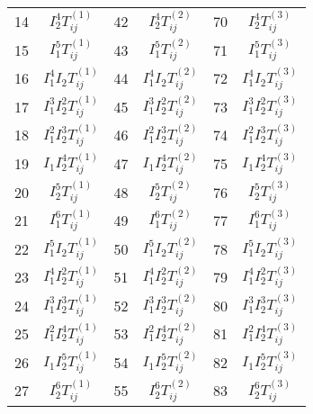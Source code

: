 \documentclass[10pt,a4paper,twoside]{article}
\begin{document}
\begin{center}
\begin{tabular}{r|c||r|c||r|c}
14 & $I_2^4 T_{ij}^{(1)}$ & 42 & $I_2^4 T_{ij}^{(2)}$ & 70 & $I_2^4 T_{ij}^{(3)}$\\
15 & $I_1^5 T_{ij}^{(1)}$ & 43 & $I_1^5 T_{ij}^{(2)}$ & 71 & $I_1^5 T_{ij}^{(3)}$\\
16 & $I_1^4I_2 T_{ij}^{(1)}$ & 44 & $I_1^4I_2 T_{ij}^{(2)}$ & 72 & $I_1^4I_2 T_{ij}^{(3)}$\\
17 & $I_1^3I_2^2 T_{ij}^{(1)}$ & 45 & $I_1^3I_2^2 T_{ij}^{(2)}$ & 73 & $I_1^3I_2^2 T_{ij}^{(3)}$\\
18 & $I_1^2I_2^3 T_{ij}^{(1)}$ & 46 & $I_1^2I_2^3 T_{ij}^{(2)}$ & 74 & $I_1^2I_2^3 T_{ij}^{(3)}$\\
19 & $I_1I_2^4 T_{ij}^{(1)}$ & 47 & $I_1I_2^4 T_{ij}^{(2)}$ & 75 & $I_1I_2^4 T_{ij}^{(3)}$\\
20 & $I_2^5 T_{ij}^{(1)}$ & 48 & $I_2^5 T_{ij}^{(2)}$ & 76 & $I_2^5 T_{ij}^{(3)}$\\
21 & $I_1^6 T_{ij}^{(1)}$ & 49 & $I_1^6 T_{ij}^{(2)}$ & 77 & $I_1^6 T_{ij}^{(3)}$\\
22 & $I_1^5I_2 T_{ij}^{(1)}$ & 50 & $I_1^5I_2 T_{ij}^{(2)}$ & 78 & $I_1^5I_2 T_{ij}^{(3)}$\\
23 & $I_1^4I_2^2 T_{ij}^{(1)}$ & 51 & $I_1^4I_2^2 T_{ij}^{(2)}$ & 79 & $I_1^4I_2^2 T_{ij}^{(3)}$\\
24 & $I_1^3I_2^3 T_{ij}^{(1)}$ & 52 & $I_1^3I_2^3 T_{ij}^{(2)}$ & 80 & $I_1^3I_2^3 T_{ij}^{(3)}$\\
25 & $I_1^2I_2^4 T_{ij}^{(1)}$ & 53 & $I_1^2I_2^4 T_{ij}^{(2)}$ & 81 & $I_1^2I_2^4 T_{ij}^{(3)}$\\
26 & $I_1I_2^5 T_{ij}^{(1)}$ & 54 & $I_1I_2^5 T_{ij}^{(2)}$ & 82 & $I_1I_2^5 T_{ij}^{(3)}$\\
27 & $I_2^6 T_{ij}^{(1)}$ & 55 & $I_2^6 T_{ij}^{(2)}$ & 83 & $I_2^6 T_{ij}^{(3)}$\\
\end{tabular}
\end{center}
\end{document}
